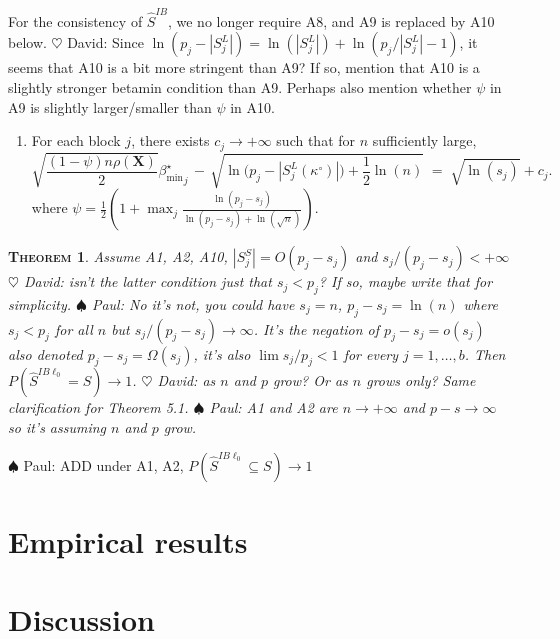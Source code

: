\documentclass[aos]{imsart}
\theoremstyle{plain}
\newtheorem{thm}{\textsc{Theorem}}[section]
\newcommand{\david}[1]{{\small{\color{blue} \sf $\heartsuit$ David: #1}}}
\newcommand{\paul}[1]{{\small{\color{green} \sf $\spadesuit$ Paul: #1}}}
\newcommand{\bs}{\boldsymbol}
\begin{document}
For the consistency of $\hat{S}^{IB}$, we no longer require A8, and A9 is replaced by A10 below.
\david{Since $\ln(p_j - |S_j^L|)= \ln(|S_j^L|) + \ln(p_j/|S_j^L| -1)$, it seems that A10 is a bit more stringent than A9? If so, mention that A10 is a slightly stronger betamin condition than A9. Perhaps also mention whether $\psi$ in A9 is slightly larger/smaller than $\psi$ in A10.}
\begin{enumerate}[start=10,label={(A\arabic*)}]
\item For each block $j$, there exists $c_{j}\to +\infty$ such that for $n$ sufficiently large, %
\begin{equation*}
        \sqrt{\frac{ (1-\psi)n\rho(\bs X)}{2}}{\beta_{\min}^{\star}}_j \,- \,\sqrt{\ln\big(p_j-|S^L_j(\kappa^{\circ})|\big)+\frac12\ln(n)} \;=\; \sqrt{\ln(s_j)} + c_{j} .
    \end{equation*}
where  $\psi=\frac12(1+\max_j \frac{\ln(p_j-s_j)}{\ln(p_j-s_j)+\ln(\sqrt{n})})$.
\end{enumerate}


\begin{thm}\label{theo:informedl0consist}
    Assume A1, A2, A10, $|S^S_j|=O(p_j-s_j)$ and $s_j / (p_j-s_j)<+\infty$ \david{isn't the latter condition just that $s_j < p_j$? If so, maybe write that for simplicity.}\paul{No it's not, you could have $s_j=n$, $p_j-s_j=\ln(n)$ where $s_j<p_j$ for all $n$ but $s_j/(p_j-s_j)\to \infty$. It's the negation of $p_j-s_j=o(s_j)$ also denoted $p_j-s_j = \Omega(s_j)$, it's also $\lim s_j/p_j <1$ } for every $j=1,\ldots,b$. Then 
$P(\hat{S}^{IB\ell_0} = S) \to 1$. \david{as $n$ and $p$ grow? Or as $n$ grows only? Same clarification for Theorem 5.1.} \paul{A1 and A2 are $n\to+\infty$ and $p-s\to\infty$ so it's assuming $n$ and $p$ grow.}
\end{thm}
\paul{ADD under A1, A2, $P(\hat{S}^{IB\ell_0} \subseteq S) \to 1$}

\section{Empirical results}\label{sec:simulation}

\section{Discussion}\label{sec:discussion}
\end{document}
